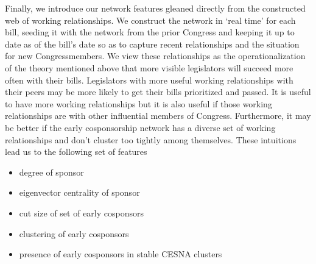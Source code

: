 Finally, we introduce our network features gleaned directly from the constructed
web of working relationships. We construct the network in `real time' for each
bill, seeding it with the network from the prior Congress and keeping it up to
date as of the bill's date so as to capture recent relationships and the
situation for new Congressmembers. We view these relationships as the
operationalization of the theory mentioned above that more visible legislators
will succeed more often with their bills. Legislators with more useful working
relationships with their peers may be more likely to get their bills prioritized
and passed. It is useful to have more working relationships but it is also
useful if those working relationships are with other influential members of
Congress. Furthermore, it may be better if the early cosponsorship network has a
diverse set of working relationships and don't cluster too tightly among
themselves. These intuitions lead us to the following set of features
\begin{itemize}
	\item degree of sponsor
	\item eigenvector centrality of sponsor
	\item cut size of set of early cosponsors
	\item clustering of early cosponsors
	\item presence of early cosponsors in stable CESNA clusters
\end{itemize}